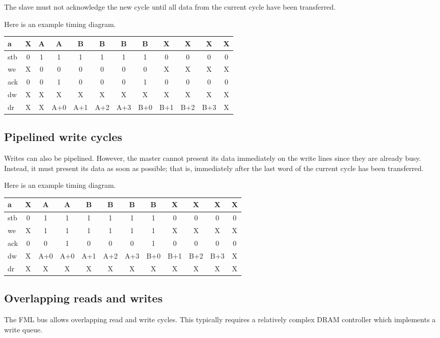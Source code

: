 \documentclass[a4paper,11pt]{article}
\begin{document}
The slave must not acknowledge the new cycle until all data from the current cycle have been transferred.

Here is an example timing diagram.

\begin{tabular}{|l|c|c|c|c|c|c|c|c|c|c|c|}
\hline
a & X & A & A & B & B & B & B & X & X & X & X\\
\hline
stb & 0 & 1 & 1 & 1 & 1 & 1 & 1 & 0 & 0 & 0 & 0 \\
\hline
we & X & 0 & 0 & 0 & 0 & 0 & 0 & X & X & X & X \\
\hline
ack & 0 & 0 & 1 & 0 & 0 & 0 & 1 & 0 & 0 & 0 & 0 \\
\hline
dw & X & X & X & X & X & X & X & X & X & X & X \\
\hline
dr & X & X & A+0 & A+1 & A+2 & A+3 & B+0 & B+1 & B+2 & B+3 & X \\
\hline
\end{tabular}

\subsection{Pipelined write cycles}
Writes can also be pipelined. However, the master cannot present its data immediately on the write lines since they are already busy. Instead, it must present its data as soon as possible; that is, immediately after the last word of the current cycle has been transferred.

Here is an example timing diagram.

\begin{tabular}{|l|c|c|c|c|c|c|c|c|c|c|c|}
\hline
a & X & A & A & B & B & B & B & X & X & X & X\\
\hline
stb & 0 & 1 & 1 & 1 & 1 & 1 & 1 & 0 & 0 & 0 & 0 \\
\hline
we & X & 1 & 1 & 1 & 1 & 1 & 1 & X & X & X & X \\
\hline
ack & 0 & 0 & 1 & 0 & 0 & 0 & 1 & 0 & 0 & 0 & 0 \\
\hline
dw & X & A+0 & A+0 & A+1 & A+2 & A+3 & B+0 & B+1 & B+2 & B+3 & X \\
\hline
dr & X & X & X & X & X & X & X & X & X & X & X \\
\hline
\end{tabular}

\subsection{Overlapping reads and writes}
The FML bus allows overlapping read and write cycles. This typically requires a relatively complex DRAM controller which implements a write queue.
\end{document}
